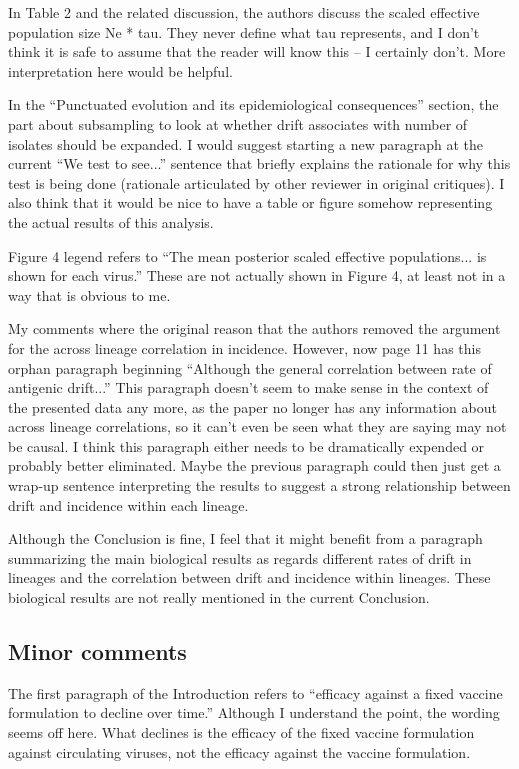 \documentclass[11pt,oneside,letterpaper]{article}
\begin{document}
In Table 2 and the related discussion, the authors discuss the scaled effective population size Ne * tau. They never define what tau represents, and I don't think it is safe to assume that the reader will know this -- I certainly don't. More interpretation here would be helpful. 

In the ``Punctuated evolution and its epidemiological consequences'' section, the part about subsampling to look at whether drift associates with number of isolates should be expanded. I would suggest starting a new paragraph at the current ``We test to see...'' sentence that briefly explains the rationale for why this test is being done (rationale articulated by other reviewer in original critiques). I also think that it would be nice to have a table or figure somehow representing the actual results of this analysis. 

Figure 4 legend refers to ``The mean posterior scaled effective populations... is shown for each virus.'' These are not actually shown in Figure 4, at least not in a way that is obvious to me. 

My comments where the original reason that the authors removed the argument for the across lineage correlation in incidence. However, now page 11 has this orphan paragraph beginning ``Although the general correlation between rate of antigenic drift...'' This paragraph doesn't seem to make sense in the context of the presented data any more, as the paper no longer has any information about across lineage correlations, so it can't even be seen what they are saying may not be causal. I think this paragraph either needs to be dramatically expended or probably better eliminated. Maybe the previous paragraph could then just get a wrap-up sentence interpreting the results to suggest a strong relationship between drift and incidence within each lineage. 

Although the Conclusion is fine, I feel that it might benefit from a paragraph summarizing the main biological results as regards different rates of drift in lineages and the correlation between drift and incidence within lineages. These biological results are not really mentioned in the current Conclusion. 

\subsection*{Minor comments}

The first paragraph of the Introduction refers to ``efficacy against a fixed vaccine formulation to decline over time.'' Although I understand the point, the wording seems off here. What declines is the efficacy of the fixed vaccine formulation against circulating viruses, not the efficacy against the vaccine formulation. 
\end{document}
